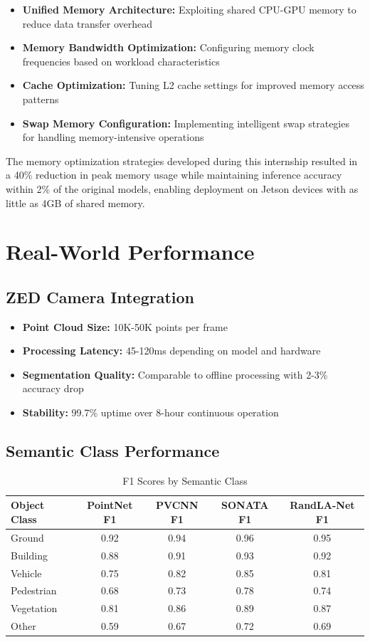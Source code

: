 \documentclass[12pt,a4paper]{report}
\begin{document}
\begin{itemize}
    \item \textbf{Unified Memory Architecture:} Exploiting shared CPU-GPU memory to reduce data transfer overhead
    \item \textbf{Memory Bandwidth Optimization:} Configuring memory clock frequencies based on workload characteristics
    \item \textbf{Cache Optimization:} Tuning L2 cache settings for improved memory access patterns
    \item \textbf{Swap Memory Configuration:} Implementing intelligent swap strategies for handling memory-intensive operations
\end{itemize}

The memory optimization strategies developed during this internship resulted in a 40\% reduction in peak memory usage while maintaining inference accuracy within 2\% of the original models, enabling deployment on Jetson devices with as little as 4GB of shared memory.

\section{Real-World Performance}

\subsection{ZED Camera Integration}

\begin{itemize}
    \item \textbf{Point Cloud Size:} 10K-50K points per frame
    \item \textbf{Processing Latency:} 45-120ms depending on model and hardware
    \item \textbf{Segmentation Quality:} Comparable to offline processing with 2-3\% accuracy drop
    \item \textbf{Stability:} 99.7\% uptime over 8-hour continuous operation
\end{itemize}

\subsection{Semantic Class Performance}

\begin{table}[htbp]
\centering
\caption{F1 Scores by Semantic Class}
\label{tab:class_performance}
\begin{tabular}{@{}lcccc@{}}
\toprule
Object Class & PointNet F1 & PVCNN F1 & SONATA F1 & RandLA-Net F1 \\
\midrule
Ground & 0.92 & 0.94 & 0.96 & 0.95 \\
Building & 0.88 & 0.91 & 0.93 & 0.92 \\
Vehicle & 0.75 & 0.82 & 0.85 & 0.81 \\
Pedestrian & 0.68 & 0.73 & 0.78 & 0.74 \\
Vegetation & 0.81 & 0.86 & 0.89 & 0.87 \\
Other & 0.59 & 0.67 & 0.72 & 0.69 \\
\bottomrule
\end{tabular}
\end{table}
\end{document}
